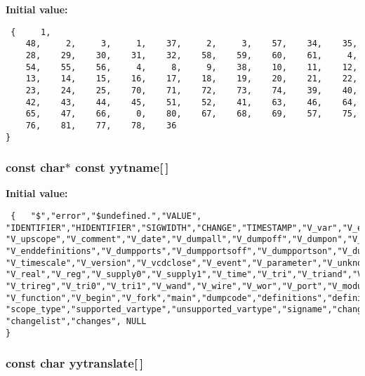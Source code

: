{\bf Initial value:}

\footnotesize\begin{verbatim} {     1,
    48,     2,     3,     1,    37,     2,     3,    57,    34,    35,
    28,    29,    30,    31,    32,    58,    59,    60,    61,     4,
    54,    55,    56,     4,     8,     9,    38,    10,    11,    12,
    13,    14,    15,    16,    17,    18,    19,    20,    21,    22,
    23,    24,    25,    70,    71,    72,    73,    74,    39,    40,
    42,    43,    44,    45,    51,    52,    41,    63,    46,    64,
    65,    47,    66,     0,    80,    67,    68,    69,    57,    75,
    76,    81,    77,    78,    36
}\end{verbatim}\normalsize 
{}
\subsubsection{\setlength{\rightskip}{0pt plus 5cm}const char$\ast$ const yytname[$\,$]\hspace{0.3cm}{\tt  [static]}}\label{vcd__parser_8c_a87}


{\bf Initial value:}

\footnotesize\begin{verbatim} {   "$","error","$undefined.","VALUE",
"IDENTIFIER","HIDENTIFIER","SIGWIDTH","CHANGE","TIMESTAMP","V_var","V_end","V_scope",
"V_upscope","V_comment","V_date","V_dumpall","V_dumpoff","V_dumpon","V_dumpvars",
"V_enddefinitions","V_dumpports","V_dumpportsoff","V_dumpportson","V_dumpportsall",
"V_timescale","V_version","V_vcdclose","V_event","V_parameter","V_unknown","V_integer",
"V_real","V_reg","V_supply0","V_supply1","V_time","V_tri","V_triand","V_trior",
"V_trireg","V_tri0","V_tri1","V_wand","V_wire","V_wor","V_port","V_module","V_task",
"V_function","V_begin","V_fork","main","dumpcode","definitions","definition",
"scope_type","supported_vartype","unsupported_vartype","signame","changelists",
"changelist","changes", NULL
}\end{verbatim}\normalsize 
{}
\subsubsection{\setlength{\rightskip}{0pt plus 5cm}const char yytranslate[$\,$]\hspace{0.3cm}{\tt  [static]}}\label{vcd__parser_8c_a83}


